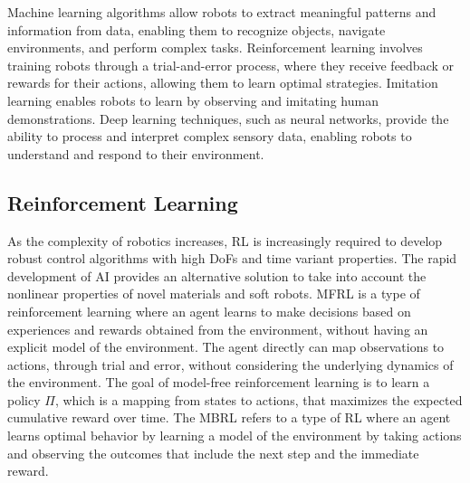 Machine learning algorithms allow robots to extract meaningful patterns and information from data, enabling them to recognize objects, navigate environments, and perform complex tasks. Reinforcement learning involves training robots through a trial-and-error process, where they receive feedback or rewards for their actions, allowing them to learn optimal strategies. Imitation learning enables robots to learn by observing and imitating human demonstrations. Deep learning techniques, such as neural networks, provide the ability to process and interpret complex sensory data, enabling robots to understand and respond to their environment.


\subsection{Reinforcement Learning}
As the complexity of robotics increases, \ac{RL} is increasingly required to develop robust control algorithms with high \ac{DoF}s and time variant properties\cite{zhangEffectiveSoftRobot2017}. The rapid development of AI provides an alternative solution to take into account the nonlinear properties of novel materials and soft robots\cite{tangModelbasedOnlineLearning2021}. \ac{MFRL} is a type of reinforcement learning where an agent learns to make decisions based on experiences and rewards obtained from the environment, without having an explicit model of the environment. The agent directly can map observations to actions, through trial and error, without considering the underlying dynamics of the environment\cite{arulkumaranDeepReinforcementLearning2017}. The goal of model-free reinforcement learning is to learn a policy $\Pi$, which is a mapping from states to actions, that maximizes the expected cumulative reward over time. The \ac{MBRL} refers to a type of \ac{RL} where an agent learns optimal behavior by learning a model of the environment by taking actions and observing the outcomes that include the next step and the immediate reward\cite{rayModelBasedReinforcementLearning2010}. 


